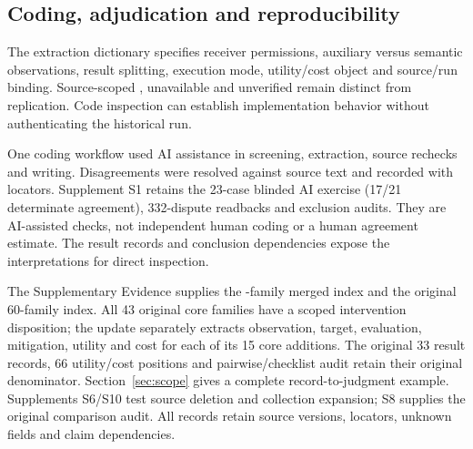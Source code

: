 \subsection{Coding, adjudication and reproducibility}
The extraction dictionary specifies receiver permissions, auxiliary versus semantic observations, result splitting, execution mode, utility/cost object and source/run binding. Source-scoped \NRR{}, unavailable \NRA{} and unverified \NRV{} remain distinct from replication. Code inspection can establish implementation behavior without authenticating the historical run.

One coding workflow used AI assistance in screening, extraction, source rechecks and writing. Disagreements were resolved against source text and recorded with locators. Supplement S1 retains the 23-case blinded AI exercise (17/21 determinate agreement), 332-dispute readbacks and exclusion audits. They are AI-assisted checks, not independent human coding or a human agreement estimate. The result records and conclusion dependencies expose the interpretations for direct inspection.

The Supplementary Evidence supplies the \FinalN{}-family merged index and the original 60-family index. All 43 original core families have a scoped intervention disposition; the update separately extracts observation, target, evaluation, mitigation, utility and cost for each of its 15 core additions. The original 33 result records, 66 utility/cost positions and pairwise/checklist audit retain their original denominator. Section~\ref{sec:scope} gives a complete record-to-judgment example. Supplements S6/S10 test source deletion and collection expansion; S8 supplies the original comparison audit. All records retain source versions, locators, unknown fields and claim dependencies.
